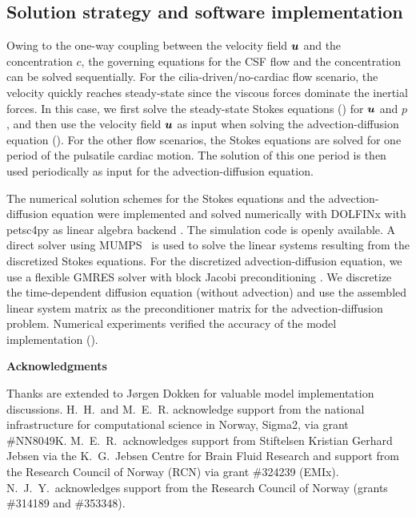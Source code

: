 \documentclass{WileyMSP-template}
\begin{document}
\subsection{Solution strategy and software implementation}
Owing to the one-way coupling between the velocity field $\bm{u}$
and the concentration $c$, the governing equations for the
CSF flow and the concentration can be solved sequentially.
For the cilia-driven/no-cardiac flow scenario, the velocity quickly reaches steady-state since
the viscous forces dominate the inertial forces.
In this case, we first solve the steady-state Stokes equations ()
for $\bm{u}$ and $p$, and then use the velocity field $\bm{u}$ as input when solving
the advection-diffusion equation ().
For the other flow scenarios, the Stokes equations are solved for one
period of the pulsatile cardiac motion. The solution of this one period
is then used periodically as input for the advection-diffusion equation.

The numerical solution schemes for the Stokes equations and the
advection-diffusion equation were implemented and solved numerically with
DOLFINx with petsc4py as linear algebra backend
\cite{dolfinx2023preprint, Dalcin2011ParallelPython}.
The simulation code is openly
available.
A direct solver using MUMPS~\cite{Amestoy2011Mumps} is used to solve the
linear systems resulting from the discretized Stokes equations.
For the discretized advection-diffusion equation, we use a flexible GMRES solver
with block Jacobi preconditioning \cite{fgmres, Jacobi1845UeberGleichungen}. 
We discretize the time-dependent diffusion equation (without advection)
and use the assembled linear system matrix
as the preconditioner matrix for the advection-diffusion problem.
Numerical experiments verified the accuracy of the model implementation
(). 

\medskip
\noindent \textbf{Acknowledgments} \par
\noindent Thanks are extended to J\o rgen Dokken
for valuable model implementation discussions.  H.~H.~and
M.~E.~R. acknowledge support from the national infrastructure for
computational science in Norway, Sigma2, via grant
\#NN8049K. M.~E.~R.~acknowledges support from Stiftelsen Kristian
Gerhard Jebsen via the K.~G.~Jebsen Centre for Brain Fluid Research
and support from the Research Council of Norway (RCN) via grant
\#324239 (EMIx). N.~J.~Y.~acknowledges support from the Research
Council of Norway (grants \#314189 and \#353348).
\end{document}
